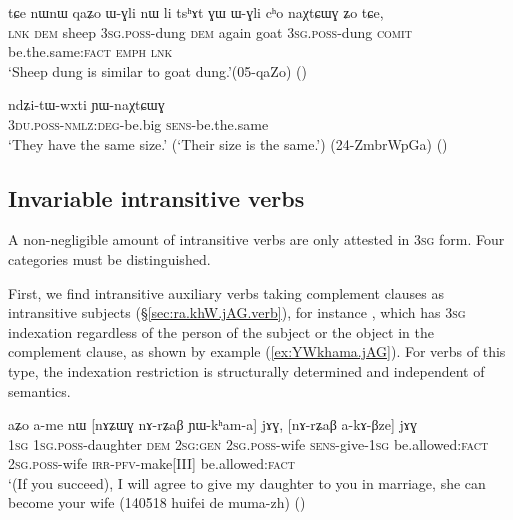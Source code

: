\begin{exe}
\ex   \label{ex:WGli.cho.naXtCWG}
 \gll   tɕe nɯnɯ qaʑo ɯ-ɣli nɯ li tsʰɤt ɣɯ ɯ-ɣli cʰo naχtɕɯɣ ʑo tɕe, \\
\textsc{lnk} \textsc{dem} sheep \textsc{3sg}.\textsc{poss}-dung \textsc{dem} again goat \textsc{3sg}.\textsc{poss}-dung \textsc{comit} be.the.same:\textsc{fact} \textsc{emph} \textsc{lnk} \\
\glt `Sheep dung is similar to goat dung.'(05-qaZo)
()
  \end{exe}

\begin{exe}
\ex   \label{ex:ndZitWwxti.YWnaXtCWG}
\gll  ndʑi-tɯ-wxti ɲɯ-naχtɕɯɣ \\
\textsc{3du}.\textsc{poss}-\textsc{nmlz}:\textsc{deg}-be.big \textsc{sens}-be.the.same \\
\glt `They have the same size.' (`Their size is the same.') (24-ZmbrWpGa) ()
\end{exe}

\subsection{Invariable intransitive verbs} \label{sec:intransitive.invariable}
A non-negligible amount of intransitive verbs are only attested in \textsc{3sg} form. Four categories must be distinguished. 

First, we find intransitive auxiliary verbs taking complement clauses as intransitive subjects (§\ref{sec:ra.khW.jAG.verb}), for instance , which has \textsc{3sg} indexation regardless of the person of the subject or the object in the complement clause, as shown by example (\ref{ex:YWkhama.jAG}). For verbs of this type, the indexation restriction is structurally determined and independent of semantics.

\begin{exe}
\ex   \label{ex:YWkhama.jAG}
\gll aʑo a-me nɯ [nɤʑɯɣ nɤ-rʑaβ ɲɯ-kʰam-a] jɤɣ, [nɤ-rʑaβ a-kɤ-βze] jɤɣ \\
\textsc{1sg} \textsc{1sg}.\textsc{poss}-daughter \textsc{dem} \textsc{2sg}:\textsc{gen} \textsc{2sg}.\textsc{poss}-wife \textsc{sens}-give-\textsc{1sg} be.allowed:\textsc{fact} \textsc{2sg}.\textsc{poss}-wife \textsc{irr}-\textsc{pfv}-make[III] be.allowed:\textsc{fact} \\
\glt `(If you succeed), I will agree to give my daughter to you in marriage, she can become your wife (140518 huifei de muma-zh)
()
\end{exe}

